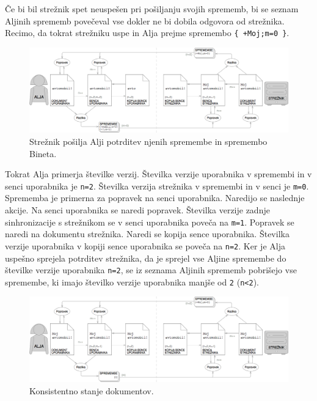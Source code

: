 \documentclass[a4paper, 12pt, twoside]{book}
\begin{document}
Če bi bil strežnik spet neuspešen pri pošiljanju svojih sprememb, bi se seznam Aljinih sprememb povečeval vse dokler ne bi dobila odgovora od strežnika. Recimo, da tokrat strežniku uspe in Alja prejme spremembo {\tt \{ +Moj;m=0 \}}.

\begin{figure}[placement h]
\begin{center}
\includegraphics[width=16cm]{ds9.png}
\end{center}
\caption{Strežnik pošilja Alji potrditev njenih spremembe in spremembo Bineta.}
\label{ds9}
\end{figure}

Tokrat Alja primerja številke verzij. Številka verzije uporabnika v spremembi in v senci uporabnika je {\tt n=2}. Številka verzija strežnika v spremembi in v senci je {\tt m=0}. Sprememba je primerna za popravek na senci uporabnika. Naredijo se naslednje akcije. Na senci uporabnika se naredi popravek. Številka verzije zadnje sinhronizacije s strežnikom se v senci uporabnika poveča na {\tt m=1}. Popravek se naredi na dokumentu strežnika. Naredi se kopija sence uporabnika. Številka verzije uporabnika v kopiji sence uporabnika se poveča na {\tt n=2}. Ker je Alja uspešno sprejela potrditev strežnika, da je sprejel vse Aljine spremembe do številke verzije uporabnika {\tt n=2}, se iz seznama Aljinih sprememb pobrišejo vse spremembe, ki imajo številko verzije uporabnika manjše od {\tt 2} ({\tt n<2}).

\begin{figure}[placement h]
\begin{center}
\includegraphics[width=16cm]{ds10.png}
\end{center}
\caption{Konsistentno stanje dokumentov.}
\label{ds10}
\end{figure}
\end{document}
